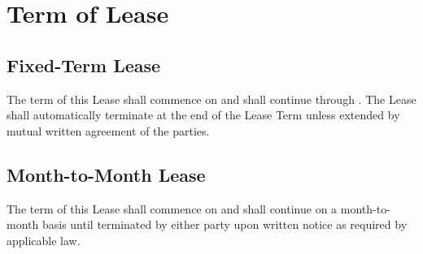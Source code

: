 
\section{Term of Lease}
\label{sec:termoflease}

\subsection{Fixed-Term Lease}
\label{sec:fixedterm}
The term of this Lease shall commence on \LeaseStartDate{} and shall continue through \LeaseEndDate{}. The Lease shall automatically terminate at the end of the Lease Term unless extended by mutual written agreement of the parties.

\subsection{Month-to-Month Lease}
\label{sec:fixedterm}
The term of this Lease shall commence on \LeaseStartDate{} and shall continue on a month-to-month basis until terminated by either party upon written notice as required by applicable law.

